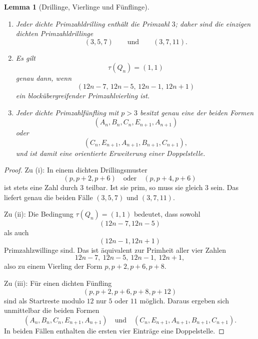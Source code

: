 \documentclass[11pt,a4paper]{article}
\newtheorem{lemma}[satz]{Lemma}
\theoremstyle{definition}
\theoremstyle{remark}
\begin{document}
	\begin{lemma}[Drillinge, Vierlinge und Fünflinge]
		\leavevmode
		\begin{enumerate}[label=\textup{(\roman*)}]
			\item Jeder dichte Primzahldrilling enthält die Primzahl \(3\); daher sind die einzigen dichten
			Primzahldrillinge
			\[
			(3,5,7)
			\qquad\text{und}\qquad
			(3,7,11).
			\]
			\item Es gilt
			\[
			\tau(Q_n)=(1,1)
			\]
			genau dann, wenn
			\[
			(12n-7,\,12n-5,\,12n-1,\,12n+1)
			\]
			ein blockübergreifender Primzahlvierling ist.
			\item Jeder dichte Primzahlfünfling mit \(p>3\) besitzt genau eine der beiden Formen
			\[
			(A_n,B_n,C_n,E_{n+1},A_{n+1})
			\]
			oder
			\[
			(C_n,E_{n+1},A_{n+1},B_{n+1},C_{n+1}),
			\]
			und ist damit eine orientierte Erweiterung einer Doppelstelle.
		\end{enumerate}
	\end{lemma}
	
	\begin{proof}
		Zu \textup{(i)}: In einem dichten Drillingsmuster
		\[
		(p,p+2,p+6)\quad\text{oder}\quad(p,p+4,p+6)
		\]
		ist stets eine Zahl durch \(3\) teilbar. Ist sie prim, so muss sie gleich \(3\) sein. Das liefert
		genau die beiden Fälle \((3,5,7)\) und \((3,7,11)\).
		
		Zu \textup{(ii)}: Die Bedingung \(\tau(Q_n)=(1,1)\) bedeutet, dass sowohl
		\[
		(12n-7,12n-5)
		\]
		als auch
		\[
		(12n-1,12n+1)
		\]
		Primzahlzwillinge sind. Das ist äquivalent zur Primheit aller vier Zahlen
		\[
		12n-7,\ 12n-5,\ 12n-1,\ 12n+1,
		\]
		also zu einem Vierling der Form \(p,p+2,p+6,p+8\).
		
		Zu \textup{(iii)}: Für einen dichten Fünfling
		\[
		(p,p+2,p+6,p+8,p+12)
		\]
		sind als Startreste modulo \(12\) nur \(5\) oder \(11\) möglich. Daraus ergeben sich unmittelbar die
		beiden Formen
		\[
		(A_n,B_n,C_n,E_{n+1},A_{n+1})
		\quad\text{und}\quad
		(C_n,E_{n+1},A_{n+1},B_{n+1},C_{n+1}).
		\]
		In beiden Fällen enthalten die ersten vier Einträge eine Doppelstelle.
	\end{proof}
	
\end{document}
